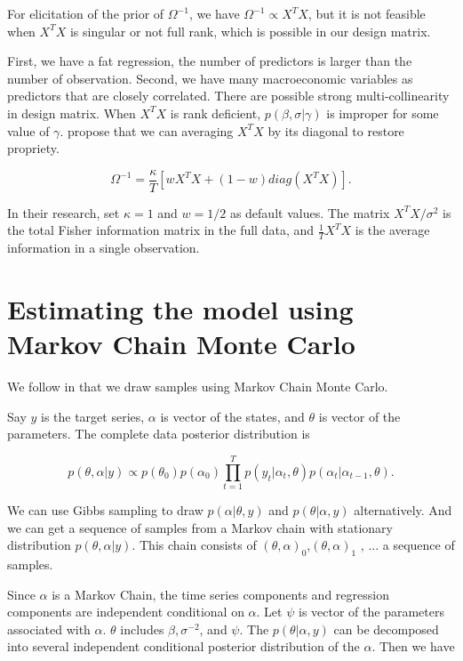 For elicitation of the prior of $\Omega^{-1}$, we have $\Omega^{-1} \propto X^T X$, but  it is not feasible when $X^T X$ is singular or not full rank, which is possible in our design matrix. 


First, we have a fat regression, the number of predictors is larger than the number of observation. Second, we have many macroeconomic variables as predictors that are closely correlated. There are possible strong multi-collinearity in design matrix. When $X^T X$ is rank deficient, $p(\beta, \sigma | \gamma)$ is improper for some value of $\gamma$.  propose that we can averaging $X^T X$ by its diagonal to restore propriety.

$$\Omega^{-1} = \frac{\kappa}{T}  [ w X^T X +(1-w)  diag(X^T X) ] .$$

In their research,  set  $\kappa = 1$ and $w = 1/2$ as default values.  The matrix $X^T X / \sigma^2$ is the total Fisher information matrix in the full data,  and $ \frac{1}{T}  X^T X$  is the average information in a single observation. 


\section{Estimating the model using Markov Chain Monte Carlo}
\label{sec:mcmc}

We follow  in that we draw samples using Markov Chain Monte Carlo. 

Say $y$ is the target series, $\alpha$ is vector of the states, and $\theta$ is vector of the parameters. The complete data posterior distribution is 

$$p(\theta , \alpha| y)  \propto p(\theta_0) p(\alpha_0) \prod_{t=1}^{T} p(y_t | \alpha_t , \theta) p(\alpha_t | \alpha_{t-1}, \theta).$$

We can use Gibbs sampling to draw $p(\alpha | \theta, y)$ and $p(\theta | \alpha, y)$ alternatively. And we can get  a sequence of samples from a Markov chain with stationary distribution $p(\theta , \alpha| y)$. This chain consists of $(\theta, \alpha)_0$,$(\theta, \alpha)_1$ , $...$ a sequence of samples.   


Since $\alpha$ is a Markov Chain, the time series components and regression components are independent conditional on $\alpha$. Let $\psi$ is vector of the parameters associated with $\alpha$.  $\theta$ includes $\beta, \sigma^{-2}$, and $\psi$. The $p(\theta | \alpha, y)$ can be decomposed into several independent conditional posterior distribution of the $\alpha$. Then we have

